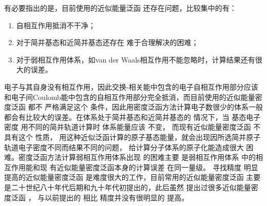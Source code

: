 有必要指出的是，目前使用的{近似能量}泛函%
还存在问题，比较集中的有：
\begin{enumerate}
	\item 自相互作用抵消不干净；
	\item 对于简并基态和近简并基态还存在%
{难于合理解决的困难}；
	\item 对于弱相互作用体系，如van der Waals相互作用不能忽略时，{计算结果}还有很大的误差。%
\end{enumerate}
电子与{其}自身没有相互作用，因此交换-相关能中包含的电子自相互作用部分应该和电子间Coulomb能中包含的自相互作用部分完全抵消，而目前使用的{近似能量密度}泛函%
都不%
{严格满足}这个%
{条件}，因此{用}密度泛函方法计算电子数很少的体系一般都会有比较大的误差。{在体系处于}简并基态和近简并基态的%
{情况下}，当%
基态电子密度%
{用}不同的简并轨道{计算}时%
体系能量应该%
{不变}，%
{而现有近似能量密度}泛函%
不具有这个%
{性质}，%
用这种近似泛函计算的原子基态能量，就会出现因所选简并原子轨道电子密度不同而结果不同的问题\cite{PRB43-6865_1991,CPL265-481_1997}，
给计算分子体系的原子化能造成很大%
困难。密度泛函方法计算弱相互作用体系出现%
的{困难}主要%
是弱相互作用体系%
{中的相互作用}能和现%
{有近似能量密度泛函}本身的{计算}误差%
{在同一量级}。%
寻找精度%
明显提高的近似能量密度泛函%
是难度很大的工作，目前常用的{近似能量密度}泛函%
主要是二十世纪八十年代后期和九十年代初提出的，此后虽然%
{提出过很多}近似{能量密度}泛函%
，%
与以前提出的%
相比%
{精度并}没有很明显的%
{提高}。

